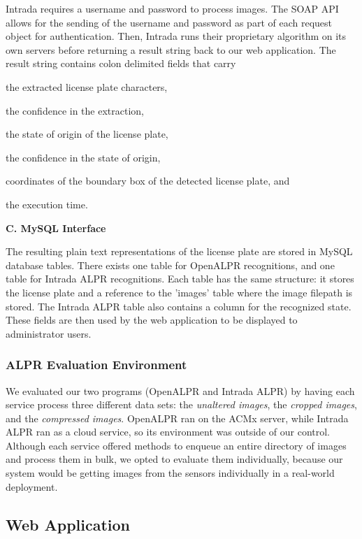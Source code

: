 \documentclass[11pt, oneside, fullpage, doublespace]{article}
\begin{document}
Intrada requires a username and password to process images. The SOAP API allows for the sending of the username and password as part of each request object for authentication. Then, Intrada runs their proprietary algorithm on its own servers before returning a result string back to our web application. The result string contains colon delimited fields that carry 
\begin{inparaenum}
\item the extracted license plate characters,
\item the confidence in the extraction,
\item the state of origin of the license plate,
\item the confidence in the state of origin,
\item coordinates of the boundary box of the detected license plate, and
\item the execution time.
\end{inparaenum}

\textbf{C. MySQL Interface}

The resulting plain text representations of the license plate are stored in MySQL database tables. There exists one table for OpenALPR recognitions, and one table for Intrada ALPR recognitions. Each table has the same structure: it stores the license plate and a reference to the 'images' table where the image filepath is stored. The Intrada ALPR table also contains a column for the recognized state. These fields are then used by the web application to be displayed to administrator users.

\subsubsection{ALPR Evaluation Environment}
We evaluated our two programs (OpenALPR and Intrada ALPR) by having each service process three different data sets: the \emph{unaltered images}, the \emph{cropped images}, and the \emph{compressed images}. OpenALPR ran on the ACMx server, while Intrada ALPR ran as a cloud service, so its environment was outside of our control. Although each service offered methods to enqueue an entire directory of images and process them in bulk, we opted to evaluate them individually, because our system would be getting images from the sensors individually in a real-world deployment.

\subsection{Web Application}
\end{document}
